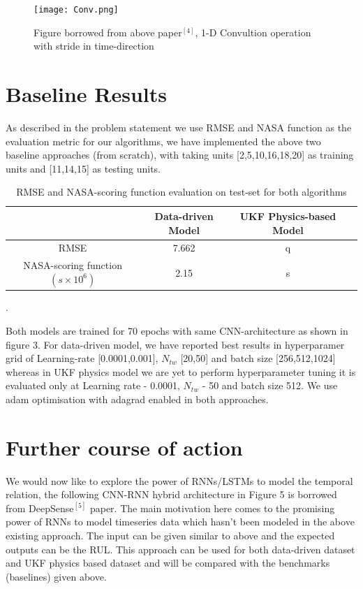 \documentclass[a4paper,12pt]{article}
\begin{document}
\begin{figure}[h]
\centering
\texttt{[image: Conv.png]}
\caption{Figure borrowed from above paper\(^{[4]}\), 1-D Convultion operation with stride in time-direction}
\end{figure}

\section{Baseline Results}
As described in the problem statement we use RMSE and NASA function as the evaluation metric for our algorithms, we have implemented the above two baseline approaches (from scratch), with taking units [2,5,10,16,18,20] as training units and [11,14,15] as testing units. 

\begin{table}[h]
\begin{center}
\begin{tabular}{ |c|c|c|c } 
 \hline
   & Data-driven Model &UKF Physics-based Model \\ 
  \hline
   RMSE & 7.662 & q \\ 
  \hline
   NASA-scoring function \( (s \times 10^{6})\) & 2.15 & s \\ 
  \hline
\end{tabular}
\caption{RMSE and NASA-scoring function evaluation on test-set for both algorithms}.
\end{center}
\end{table}
Both models are trained for 70 epochs with same CNN-architecture as shown in figure 3. For data-driven model, we have reported best results in  hyperparamer grid of Learning-rate [0.0001,0.001], \(N_{tw}\) [20,50] and batch size [256,512,1024] whereas in UKF physics model we are yet to perform hyperparameter tuning it is evaluated only at Learning rate - 0.0001, \(N_{tw}\) - 50 and batch size 512. We use adam optimisation with adagrad enabled in both approaches.

\section{Further course of action}

We would now like to explore the power of RNNs/LSTMs to model the temporal relation, the following CNN-RNN hybrid architecture in Figure 5 is borrowed from DeepSense\(^{[5]}\) paper. The main motivation here comes to the promising power of RNNs to model timeseries data which hasn't been modeled in the above existing approach. The input can be given similar to above and the expected outputs can be the RUL. This approach can be used for both data-driven dataset and UKF physics based dataset and will be compared with the benchmarks (baselines) given above.
\end{document}
